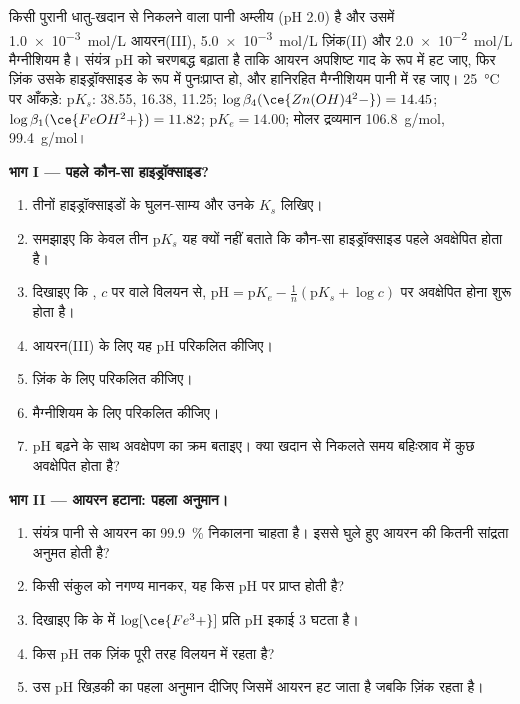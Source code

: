 \begin{problem}
\label{pb:b1:precipitation:1}
किसी पुरानी धातु-खदान से निकलने वाला पानी अम्लीय (pH 2.0) है और उसमें
\qty{1.0e-3}{mol/L} आयरन(III), \qty{5.0e-3}{mol/L} ज़िंक(II) और
\qty{2.0e-2}{mol/L} मैग्नीशियम है। संयंत्र pH को चरणबद्ध बढ़ाता है ताकि
आयरन अपशिष्ट गाद के रूप में हट जाए, फिर ज़िंक उसके
हाइड्रॉक्साइड के रूप में पुनःप्राप्त हो, और हानिरहित मैग्नीशियम पानी में रह जाए।
\qty{25}{\celsius} पर आँकड़े: $\mathrm{p}K_s$:  38.55, 
16.38,  11.25; $\log\beta_4(\ce{Zn(OH)4^2-}) = 14.45$;
$\log\beta_1(\ce{FeOH^2+}) = 11.82$; $\mathrm{p}K_e = 14.00$; मोलर द्रव्यमान
 \qty{106.8}{g/mol},  \qty{99.4}{g/mol}।

\medskip
\noindent\textbf{भाग I --- पहले कौन-सा हाइड्रॉक्साइड?}
\begin{enumerate}
  \item तीनों हाइड्रॉक्साइडों के घुलन-साम्य और
        उनके $K_s$ लिखिए।
  \item समझाइए कि केवल तीन $\mathrm{p}K_s$ यह क्यों नहीं बताते कि कौन-सा
        हाइड्रॉक्साइड पहले अवक्षेपित होता है।
  \item दिखाइए कि , $c$ पर  वाले विलयन से,
        $\mathrm{pH} = \mathrm{p}K_e -
        \frac1n(\mathrm{p}K_s + \log c)$ पर अवक्षेपित होना शुरू होता है।
  \item आयरन(III) के लिए यह pH परिकलित कीजिए।
  \item ज़िंक के लिए परिकलित कीजिए।
  \item मैग्नीशियम के लिए परिकलित कीजिए।
  \item pH बढ़ने के साथ अवक्षेपण का क्रम बताइए। क्या खदान से निकलते समय
        बहिःस्राव में कुछ अवक्षेपित होता है?
\end{enumerate}

\medskip
\noindent\textbf{भाग II --- आयरन हटाना: पहला अनुमान।}
\begin{enumerate}[resume]
  \item संयंत्र पानी से आयरन का \qty{99.9}{\percent} निकालना चाहता है। इससे
        घुले हुए आयरन की कितनी सांद्रता अनुमत होती है?
  \item किसी संकुल को नगण्य मानकर, यह किस pH पर प्राप्त होती है?
  \item दिखाइए कि  के  में
        $\log[\ce{Fe^3+}]$ प्रति pH इकाई 3 घटता है।
  \item किस pH तक ज़िंक पूरी तरह विलयन में रहता है?
  \item उस pH खिड़की का पहला अनुमान दीजिए जिसमें आयरन हट जाता है
        जबकि ज़िंक रहता है।
\end{enumerate}


\end{problem}
